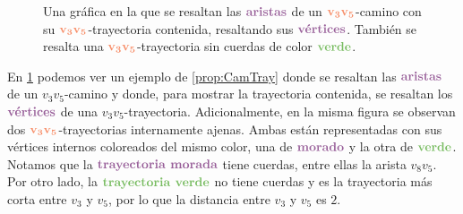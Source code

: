 \begin{figure}[htb!]
    \centering
    \caption{Una gr\'afica en la que se resaltan las ${\color{morado}\bf
    aristas}$ de un ${\color{coral}\bf v_3 v_5}$-camino con su
    ${\color{coral}\bf v_3 v_5}$-trayectoria contenida, resaltando sus
    ${\color{morado}\textbf{v\'ertices}}$.  Tambi\'en se resalta una
    ${\color{coral}\bf v_3 v_5}$-trayectoria sin cuerdas de color
    ${\color{verde}\bf verde}$.}
    \label{fig:ex-caminos}
\end{figure}
    
En \cref{fig:ex-caminos} podemos ver un ejemplo de \ref{prop:CamTray} donde se
resaltan las ${\color{morado}\bf aristas}$ de un $v_3 v_5$-camino y donde, para
mostrar la trayectoria contenida, se resaltan los
${\color{morado}\textbf{v\'ertices}}$ de una $v_3 v_5$-trayectoria.
Adicionalmente, en la misma figura se observan dos ${\color{coral}\bf v_3
v_5}$-trayectorias internamente ajenas. Ambas est\'an representadas con sus
v\'ertices internos coloreados del mismo color, una de ${\color{morado}\bf
morado}$ y la otra de ${\color{verde}\bf verde}$. Notamos que la
${\color{morado}\textbf{trayectoria morada}}$ tiene cuerdas, entre ellas la
arista $v_8v_5$. Por otro lado, la ${\color{verde}\textbf{trayectoria verde}}$
no tiene cuerdas y es la trayectoria m\'as corta entre $v_3$ y $v_5$, por lo que
la distancia entre $v_3$ y $v_5$ es $2$.

